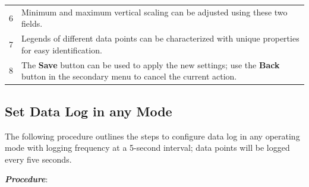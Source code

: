 \begin{longtable}[]{@{}ll@{}}
\begin{minipage}[t]{0.07\columnwidth}
6\strut
\end{minipage} & \begin{minipage}[t]{0.88\columnwidth}\raggedright
Minimum and maximum vertical scaling can be adjusted using these two
fields.\strut
\end{minipage}\tabularnewline
\begin{minipage}[t]{0.07\columnwidth}\raggedright
7\strut
\end{minipage} & \begin{minipage}[t]{0.88\columnwidth}\raggedright
Legends of different data points can be characterized with unique
properties for easy identification.\strut
\end{minipage}\tabularnewline
\begin{minipage}[t]{0.07\columnwidth}\raggedright
8\strut
\end{minipage} & \begin{minipage}[t]{0.88\columnwidth}\raggedright
The \textbf{Save} button can be used to apply the new settings; use the
\textbf{Back} button in the secondary menu to cancel the current
action.\strut
\end{minipage}\tabularnewline
\bottomrule
\end{longtable}


\subsection{Set Data Log in any
Mode}

The following procedure outlines the steps to configure data log in any
operating mode with logging frequency at a 5-second interval; data
points will be logged every five seconds.

\textbf{\emph{Procedure}}:

